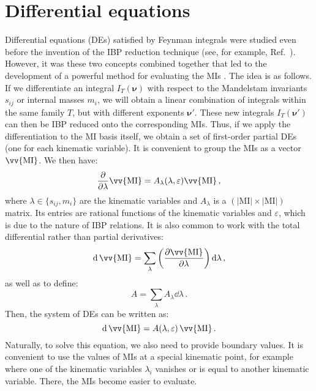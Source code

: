 \documentclass[main.tex]{subfiles}
\begin{document}
\section{Differential equations} \label{sec:DEs}
Differential equations (DEs) satisfied by Feynman integrals were studied even before the invention of the IBP reduction technique (see, for example, Ref.~\cite{Golubeva:1976}). However, it was these two concepts combined together that led to the development of a powerful method for evaluating the MIs \cite{Kotikov:1990kg, Kotikov:1991314, Bern:1993kr, Remiddi:1997ny, Gehrmann:1999as}. The idea is as follows. If we differentiate an integral $I_T(\bm{\nu})$ with respect to the Mandelstam invariants $s_{ij}$ or internal masses $m_i$, we will obtain a linear combination of integrals within the same family $T$, but with different exponents $\bm{\nu}'$. These new integrals $I_T(\bm{\nu}')$ can then be IBP reduced onto the corresponding MIs. Thus, if we apply the differentiation to the MI basis itself, we obtain a set of first-order partial DEs (one for each kinematic variable). It is convenient to group the MIs as a vector $\vv{\text{MI}}$. We then have:
\begin{equation} \label{eq:DEspartial}
    \frac{\partial}{\partial \lambda} \vv{\text{MI}} = A_{\lambda}(\lambda, \varepsilon) \vv{\text{MI}}\,,
\end{equation}
where $\lambda \in \{s_{ij}, m_i\}$ are the kinematic variables and $A_\lambda$ is a $\left(|\text{MI}| \times |\text{MI}|\right)$ matrix. Its entries are rational functions of the kinematic variables and $\varepsilon$, which is due to the nature of IBP relations. It is also common to work with the total differential rather than partial derivatives:
\begin{equation}
    \dd \,\vv{\text{MI}} = \sum_{\lambda} \left(\frac{\partial \vv{\text{MI}}}{\partial \lambda} \right) \dd \lambda\,,
\end{equation}
as well as to define:
\begin{equation}
    A = \sum_\lambda A_\lambda \dd\lambda\,.
\end{equation}
Then, the system of DEs can be written as:
\begin{equation} \label{eq:DEsoneform}
    \dd \,\vv{\text{MI}} = A(\lambda, \varepsilon) \,\vv{\text{MI}}\,.
\end{equation}
Naturally, to solve this equation, we also need to provide boundary values. It is convenient to use the values of MIs at a special kinematic point, for example where one of the kinematic variables $\lambda_i$ vanishes or is equal to another kinematic variable. There, the MIs become easier to evaluate. 
\end{document}
